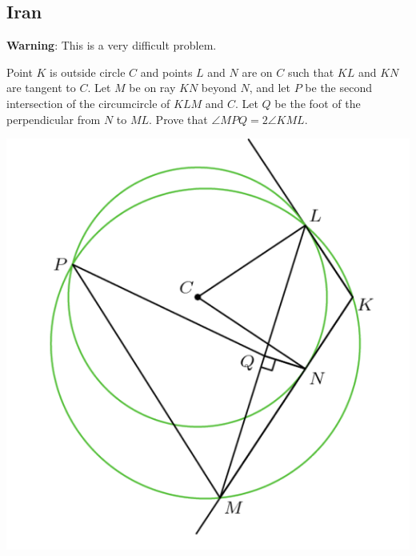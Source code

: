\documentclass[12pt]{scrartcl}
\newcommand{\<}{\langle}
\renewcommand{\>}{\rangle}
\begin{document}
\subsection{Iran}
\textbf{Warning}: This is a very difficult problem.
\begin{Prob}[Iran] Point $K$ is outside circle $C$ and points $L$ and $N$ are on $C$ such that $KL$ and $KN$ are tangent to $C$.  Let $M$ be on ray $KN$ beyond $N$, and let $P$ be the second intersection of the circumcircle of $KLM$ and $C$.  Let $Q$ be the foot of the perpendicular from $N$ to $ML$.  Prove that $\angle MPQ = 2\angle KML$.
\end{Prob}
\begin{center}
\includegraphics[scale=0.7]{graphics/p2-5.png}
\end{center}
\end{document}
